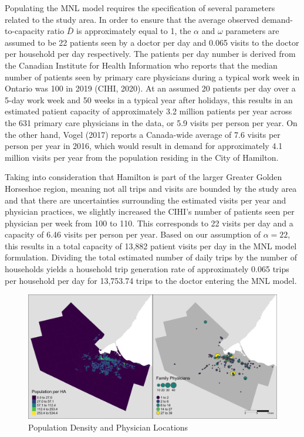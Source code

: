 \documentclass[]{elsarticle} %
\begin{document}
Populating the MNL model requires the specification of several
parameters related to the study area. In order to ensure that the
average observed demand-to-capacity ratio \(\bar{D}\) is approximately
equal to 1, the \(\alpha\) and \(\omega\) parameters are assumed to be
22 patients seen by a doctor per day and 0.065 visits to the doctor per
household per day respectively. The patients per day number is derived
from the Canadian Institute for Health Information who reports that the
median number of patients seen by primary care physicians during a
typical work week in Ontario was 100 in 2019 (CIHI, 2020). At an assumed
20 patients per day over a 5-day work week and 50 weeks in a typical
year after holidays, this results in an estimated patient capacity of
approximately 3.2 million patients per year across the 631 primary care
physicians in the data, or 5.9 visits per person per year. On the other
hand, Vogel (2017) reports a Canada-wide average of 7.6 visits per
person per year in 2016, which would result in demand for approximately
4.1 million visits per year from the population residing in the City of
Hamilton.

Taking into consideration that Hamilton is part of the larger Greater
Golden Horseshoe region, meaning not all trips and visits are bounded by
the study area and that there are uncertainties surrounding the
estimated visits per year and physician practices, we slightly increased
the CIHI's number of patients seen per physician per week from 100 to
110. This corresponds to 22 visits per day and a capacity of 6.46 visits
per person per year. Based on our assumption of \(\alpha = 22\), this
results in a total capacity of 13,882 patient visits per day in the MNL
model formulation. Dividing the total estimated number of daily trips by
the number of households yields a household trip generation rate of
approximately 0.065 trips per household per day for 13,753.74 trips to
the doctor entering the MNL model.

\begin{figure}
\includegraphics[width=1\linewidth]{./img/study_area_map} \caption{\label{fig:study_area_map}Population Density and Physician Locations}\label{fig:fig 1 study_area_map}
\end{figure}
\end{document}
